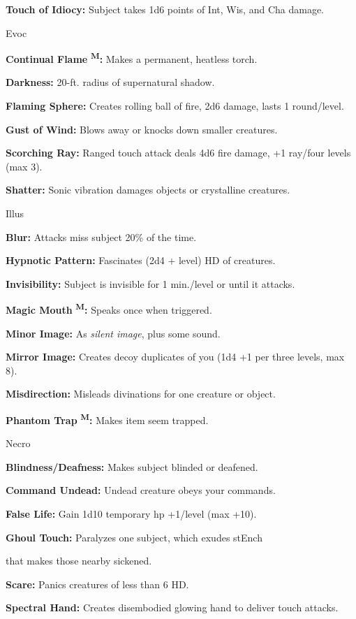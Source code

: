 \documentclass{article}
\begin{document}
\textbf{Touch of Idiocy:} Subject takes 1d6 points of Int, Wis, and Cha damage.

Evoc

\textbf{Continual Flame }\textsuperscript{\textbf{M}}\textbf{:} Makes a permanent, 
heatless torch.

\textbf{Darkness:} 20-ft. radius of supernatural shadow.

\textbf{Flaming Sphere:} Creates rolling ball of fire, 2d6 damage, lasts 1 round/level.

\textbf{Gust of Wind:} Blows away or knocks down smaller creatures.

\textbf{Scorching Ray:} Ranged touch attack deals 4d6 fire damage, +1 ray/four 
levels (max 3).

\textbf{Shatter:} Sonic vibration damages objects or crystalline creatures.

Illus

\textbf{Blur:} Attacks miss subject 20\% of the time.

\textbf{Hypnotic Pattern:} Fascinates (2d4 + level) HD of creatures.

\textbf{Invisibility:} Subject is invisible for 1 min./level or until it attacks.

\textbf{Magic Mouth }\textsuperscript{\textbf{M}}\textbf{:} Speaks once when triggered.

\textbf{Minor Image:} As \textit{silent image}, plus some sound.

\textbf{Mirror Image:} Creates decoy duplicates of you (1d4 +1 per three levels, 
max 8).

\textbf{Misdirection:} Misleads divinations for one creature or object.

\textbf{Phantom Trap }\textsuperscript{\textbf{M}}\textbf{: }Makes item seem trapped.

Necro

\textbf{Blindness/Deafness:} Makes subject blinded or deafened.

\textbf{Command Undead:} Undead creature obeys your commands.

\textbf{False Life:} Gain 1d10 temporary hp +1/level (max +10).

\textbf{Ghoul Touch:} Paralyzes one subject, which exudes stEnch

that makes those nearby sickened.

\textbf{Scare:} Panics creatures of less than 6 HD.

\textbf{Spectral Hand:} Creates disembodied glowing hand to deliver touch attacks.
\end{document}
